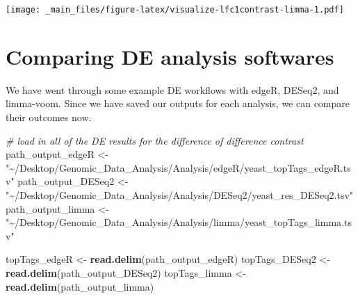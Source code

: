 \documentclass[
]{book}
\newenvironment{Shaded}{\begin{snugshade}}{\end{snugshade}}
\newcommand{\CommentTok}[1]{\textcolor[rgb]{0.56,0.35,0.01}{\textit{#1}}}
\newcommand{\FunctionTok}[1]{\textcolor[rgb]{0.13,0.29,0.53}{\textbf{#1}}}
\newcommand{\NormalTok}[1]{#1}
\newcommand{\OtherTok}[1]{\textcolor[rgb]{0.56,0.35,0.01}{#1}}
\newcommand{\StringTok}[1]{\textcolor[rgb]{0.31,0.60,0.02}{#1}}
\begin{document}
\texttt{[image: \_main\_files/figure-latex/visualize-lfc1contrast-limma-1.pdf]}

\hypertarget{comparing-de-analysis-softwares}{%
\section{Comparing DE analysis softwares}\label{comparing-de-analysis-softwares}}

We have went through some example DE workflows with edgeR, DESeq2, and
limma-voom. Since we have saved our outputs for each analysis, we can
compare their outcomes now.

\begin{Shaded}
\begin{Highlighting}[]
\CommentTok{\# load in all of the DE results for the difference of difference contrast}
\NormalTok{path\_output\_edgeR }\OtherTok{\textless{}{-}} \StringTok{"\textasciitilde{}/Desktop/Genomic\_Data\_Analysis/Analysis/edgeR/yeast\_topTags\_edgeR.tsv"}
\NormalTok{path\_output\_DESeq2 }\OtherTok{\textless{}{-}} \StringTok{"\textasciitilde{}/Desktop/Genomic\_Data\_Analysis/Analysis/DESeq2/yeast\_res\_DESeq2.tsv"}
\NormalTok{path\_output\_limma }\OtherTok{\textless{}{-}} \StringTok{"\textasciitilde{}/Desktop/Genomic\_Data\_Analysis/Analysis/limma/yeast\_topTags\_limma.tsv"}

\NormalTok{topTags\_edgeR }\OtherTok{\textless{}{-}} \FunctionTok{read.delim}\NormalTok{(path\_output\_edgeR)}
\NormalTok{topTags\_DESeq2 }\OtherTok{\textless{}{-}} \FunctionTok{read.delim}\NormalTok{(path\_output\_DESeq2)}
\NormalTok{topTags\_limma }\OtherTok{\textless{}{-}} \FunctionTok{read.delim}\NormalTok{(path\_output\_limma)}
\end{Highlighting}
\end{Shaded}
\end{document}
